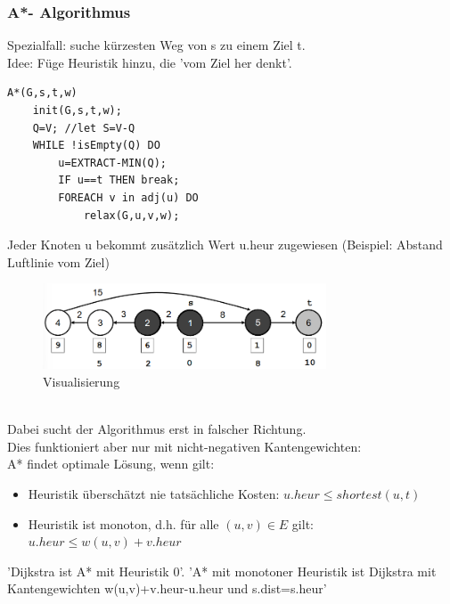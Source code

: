 \documentclass{article}
\begin{document}
            \subsubsection{A*- Algorithmus}
                Spezialfall: suche kürzesten Weg von s zu einem Ziel t.\\
                Idee: Füge Heuristik hinzu, die 'vom Ziel her denkt'.\\
                \begin{lstlisting}[style=pseudocode]
A*(G,s,t,w)
    init(G,s,t,w);
    Q=V; //let S=V-Q
    WHILE !isEmpty(Q) DO
        u=EXTRACT-MIN(Q);
        IF u==t THEN break;
        FOREACH v in adj(u) DO
            relax(G,u,v,w);
                \end{lstlisting}
                Jeder Knoten u bekommt zusätzlich Wert u.heur zugewiesen (Beispiel: Abstand Luftlinie vom Ziel)\\
                \begin{figure}[ht]
                    \centering
                    \includegraphics[width=0.75\textwidth]{Bilder/AStern.png}
                    \caption{Visualisierung}
                    \label{fig:AStern}
                \end{figure}\\
                Dabei sucht der Algorithmus erst in falscher Richtung.\\
                Dies funktioniert aber nur mit nicht-negativen Kantengewichten:\\
                A* findet optimale Lösung, wenn gilt:
                \begin{itemize}
                    \item Heuristik überschätzt nie tatsächliche Kosten: $u.heur \leq shortest(u,t)$
                    \item Heuristik ist monoton, d.h. für alle $(u,v) \in E$ gilt: $u.heur \leq w(u,v) + v.heur$
                \end{itemize}
                'Dijkstra ist A* mit Heuristik 0'. 'A* mit monotoner Heuristik ist Dijkstra mit Kantengewichten w(u,v)+v.heur-u.heur und s.dist=s.heur'
\end{document}
